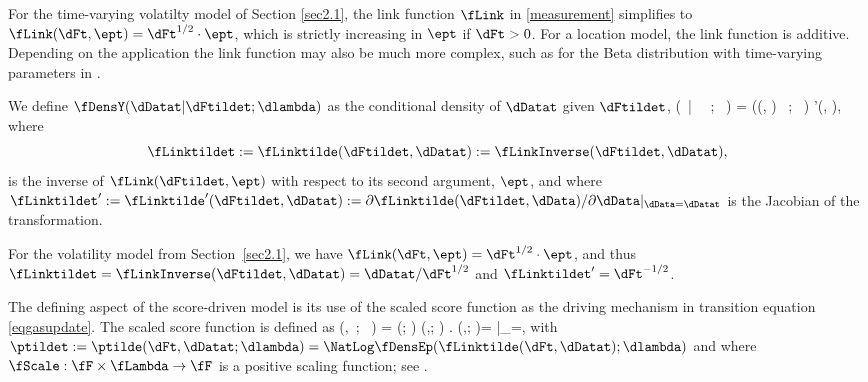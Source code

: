 \begin{exmc} %
For the time-varying volatilty model of Section \ref{sec2.1}, the link function $\fLink$ in \eqref{measurement} simplifies to $\fLink(\dFt,\ept) = \dFt^{1/2}\cdot\ept$, which is strictly increasing in $\ept$ if $\dFt>0$.
For a location model, the link function is additive.
Depending on the application the link function may also be much more complex, such as for the Beta distribution with time-varying parameters in \citet{cskl2014}.
\end{exmc}


We define $\fDensY (\dDatat  |  \dFtildet  ;  \dlambda  )$ as the conditional density of $\dDatat$ given 
$\dFtildet$,%
   \fDensY\big(\dDatat \ \big| \ \dFtArgs \ ; \ \dlambda \big) =
   \fDensEp\big(\fLinktilde(\dFtildet  ,  \dDatat) \ ; \ \dlambda \big) \cdot
   \fLinktilde'(\dFtildet , \dDatat ),
\eq
where 
$$\fLinktildet := \fLinktilde(\dFtildet,\dDatat) : =  \fLinkInverse (\dFtildet,\dDatat),$$ 
is the inverse of $\fLink(\dFtildet, \ept)$ with respect to its second argument, $\ept$,
and where $\fLinktildet': = \fLinktilde'(\dFtildet,\dDatat ) : = 
\partial \fLinktilde (\dFtildet,\dData )/ \partial \dData|_{\dData=\dDatat}$ is the Jacobian of the transformation.


\begin{exmc} %
For the volatility model from Section~\ref{sec2.1}, we have $\fLink(\dFt,\ept) = \dFt^{1/2}\cdot\ept$, and thus $\fLinktildet = \fLinkInverse(\dFtildet,\dDatat) = \dDatat/\dFt^{1/2}$ and $\fLinktildet' = \dFt^{-1/2}$.
\end{exmc}

The defining aspect of the score-driven model is its use of the scaled score function as the
driving mechanism in transition equation \eqref{eqgasupdate}.
The scaled score function is defined as
    \fScaledScore \big(\dFtildet ,\dDatat\ ; \  \dlambda \big) = 
    \fScale(\dFtildet; \dlambda) \cdot  \fScoret(\dFtildet,\dDatat; \dlambda)
    \left. \quad  {} \quad \fScoret(\dFtildet,\dDatat; \dlambda)= \right|_{\dF=\dFt},
\eq
with $\ptildet := \ptilde(\dFt,\dDatat ;\dlambda) = 
\NatLog \fDensEp(\fLinktilde(\dFt,\dDatat);\dlambda)$
and where $\fScale:\fF \times \fLambda \to \fF$ is a positive scaling function; see \citet{CKL2013}. 


